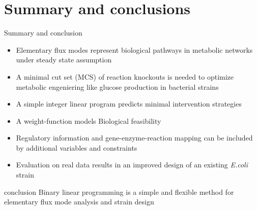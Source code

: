 \documentclass{beamer}
\begin{document}
\section{Summary and conclusions}
\begin{frame}{Summary and conclusion}
\begin{itemize}
    \item Elementary flux modes represent biological pathways 
        in metabolic networks under steady state assumption
    \item A minimal cut set (MCS) of reaction knockouts is needed to optimize 
    metabolic engeniering like glucose production in bacterial strains
    \item A simple integer linear program predicts minimal intervention strategies
    \item A weight-function models Biological feasibility
    \item Regulatory information and gene-enzyme-reaction mapping 
    can be included by additional variables and constraints
    \item Evaluation on real data results in an improved design  
    of an existing \emph{E.coli} strain
\end{itemize}	
\begin{block}{conclusion}
    Binary linear programming is a simple and flexible method for 
    elementary flux mode analysis and strain design
\end{block}
\end{frame}
\end{document}
